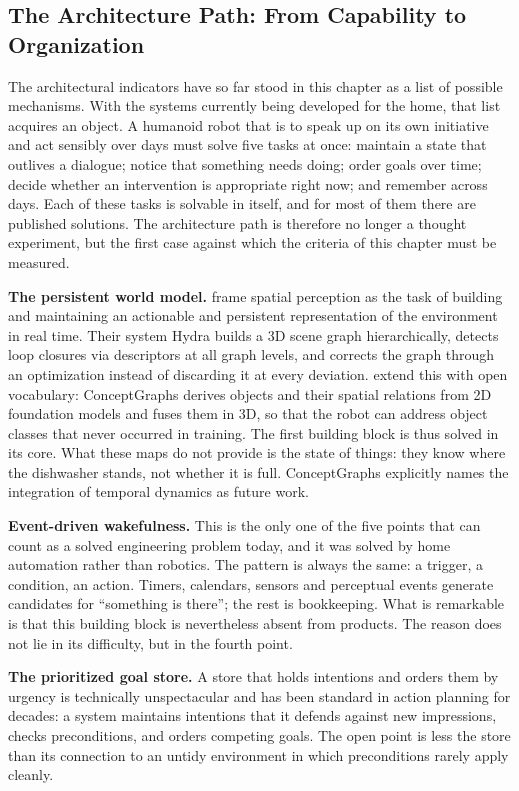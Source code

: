 \documentclass[acmlarge, nonacm]{acmart}
\begin{document}
\subsection{The Architecture Path: From Capability to Organization}

The architectural indicators have so far stood in this chapter as a list of possible mechanisms. With the systems currently being developed for the home, that list acquires an object. A humanoid robot that is to speak up on its own initiative and act sensibly over days must solve five tasks at once: maintain a state that outlives a dialogue; notice that something needs doing; order goals over time; decide whether an intervention is appropriate right now; and remember across days. Each of these tasks is solvable in itself, and for most of them there are published solutions. The architecture path is therefore no longer a thought experiment, but the first case against which the criteria of this chapter must be measured.

\textbf{The persistent world model.} \citet{hughes2024} frame spatial perception as the task of building and maintaining an actionable and persistent representation of the environment in real time. Their system Hydra builds a 3D scene graph hierarchically, detects loop closures via descriptors at all graph levels, and corrects the graph through an optimization instead of discarding it at every deviation. \citet{gu2024} extend this with open vocabulary: ConceptGraphs derives objects and their spatial relations from 2D foundation models and fuses them in 3D, so that the robot can address object classes that never occurred in training. The first building block is thus solved in its core. What these maps do not provide is the state of things: they know where the dishwasher stands, not whether it is full. ConceptGraphs explicitly names the integration of temporal dynamics as future work.

\textbf{Event-driven wakefulness.} This is the only one of the five points that can count as a solved engineering problem today, and it was solved by home automation rather than robotics. The pattern is always the same: a trigger, a condition, an action. Timers, calendars, sensors and perceptual events generate candidates for ``something is there''; the rest is bookkeeping. What is remarkable is that this building block is nevertheless absent from products. The reason does not lie in its difficulty, but in the fourth point.

\textbf{The prioritized goal store.} A store that holds intentions and orders them by urgency is technically unspectacular and has been standard in action planning for decades: a system maintains intentions that it defends against new impressions, checks preconditions, and orders competing goals. The open point is less the store than its connection to an untidy environment in which preconditions rarely apply cleanly.
\end{document}
